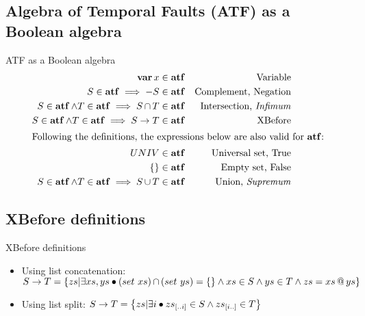\documentclass{beamer}
\makeatletter
\def\ATF{%
	Algebra of Temporal Faults (ATF)%
	\gdef\ATF{ATF\xspace}%
	\gdef\iATF{an ATF\xspace}%
	\gdef\IATF{An ATF\xspace}%
	\xspace%
}
\def\iATF{%
	an Algebra of Temporal Faults (ATF)%
	\gdef\ATF{ATF\xspace}%
	\gdef\iATF{an ATF\xspace}%
	\gdef\IATF{An ATF\xspace}%
	\xspace%
}
\def\IATF{%
	An Algebra of Temporal Faults (ATF)%
	\gdef\ATF{ATF\xspace}%
	\gdef\iATF{an ATF\xspace}%
	\gdef\IATF{An ATF\xspace}%
	\xspace%
}
\def\varop{\ensuremath\operatorname{\mathbf{var}}}
\newcommand{\var}[1]{\ensuremath\varop #1}
\newcommand{\sliceright}[2]{\ensuremath #1_{\left[..#2\right]}}
\newcommand{\sliceleft}[2]{\ensuremath #1_{\left[#2..\right]}}
\def\xbeforeop{\ensuremath\rightarrow}
\newcommand{\xbefore}[2]{\ensuremath #1 \xbeforeop #2 }
\def\union{\ensuremath\operatorname{\cup}}
\def\inter{\ensuremath\operatorname{\cap}}
\def\algebraset{\ensuremath\operatorname{\mathbf{atf}}}
\newcommand{\append}[2]{\ensuremath #1 \operatorname{\mathbf{@}} #2}
\makeatother
\begin{document}
\subsection{\ATF as a Boolean algebra}

\begin{frame}[label=inductiveatf]{\ATF as a Boolean algebra}
	\begin{align*}
		\var x & \in \algebraset & \text{Variable}\\
		S \in \algebraset \implies -S & \in \algebraset & \text{Complement, Negation}\\
		S \in \algebraset \land T \in \algebraset \implies S \inter T & \in \algebraset & \text{Intersection, \emph{Infimum}}\\
		S \in \algebraset \land T \in \algebraset \implies \xbefore{S}{T} & \in \algebraset & \text{XBefore}\\
		\intertext{Following the definitions, the expressions below are also valid for $\algebraset$:}
		UNIV &\in \algebraset & \text{Universal set, True}\\
		\{\} &\in \algebraset & \text{Empty set, False}\\
		S \in \algebraset \land T \in \algebraset \implies S \union T &\in \algebraset & \text{Union, \emph{Supremum}}
	\end{align*}
	\hyperlink{thealgebra}{}
\end{frame}

\subsection{XBefore definitions}

\begin{frame}[label=xbeforedefs]{XBefore definitions}
	\begin{itemize}
		\item Using list concatenation:
			{\scriptsize
						$\xbefore{S}{T} =
									  \left\{
									    zs | \exists xs, ys \bullet \left(set~xs\right) \inter \left(set~ys\right) = \{\}
									      \land xs \in S \land ys \in T \land zs = \append{xs}{ys}
									  \right\}$}
		\item Using list split:
			{\scriptsize
				$\xbefore{S}{T} =
									\left\{
										zs | \exists i \bullet \sliceright{zs}{i} \in S \land \sliceleft{zs}{i} \in T
									\right\}$}
	\end{itemize}
	\hyperlink{expressorder}{}
\end{frame}
\end{document}
